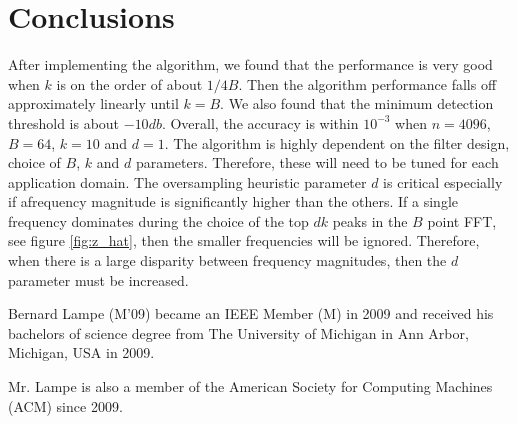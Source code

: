 \documentclass[journal]{IEEEtran}
\begin{document}
\section{Conclusions}
\par After implementing the algorithm, we found that the performance is very good when \(k\) is on the order of about \(1/4B\). Then the algorithm performance falls off approximately linearly until \(k=B\). We also found that the minimum detection threshold is about \(-10db\). Overall, the accuracy is within \(10^{-3}\) when \(n=4096\), \(B=64\), \(k=10\) and \(d=1\). The algorithm is highly dependent on the filter design, choice of \(B\), \(k\) and \(d\) parameters. Therefore, these will need to be tuned for each application domain. The oversampling heuristic parameter \(d\) is critical especially if afrequency magnitude is significantly higher than the others. If a single frequency dominates during the choice of the top \(dk\) peaks in the \(B\) point FFT, see figure \ref{fig:z_hat}, then the smaller frequencies will be ignored. Therefore, when there is a large disparity between frequency magnitudes, then the \(d\) parameter must be increased.

\nocite{*}



\begin{IEEEbiographynophoto}{Bernard Lampe}
(M'09) became an IEEE Member (M) in 2009 and received his bachelors of science degree from The University of Michigan in Ann Arbor, Michigan, USA in 2009.
\par Mr. Lampe is also a member of the American Society for Computing Machines (ACM) since 2009.
\end{IEEEbiographynophoto}

\end{document}
